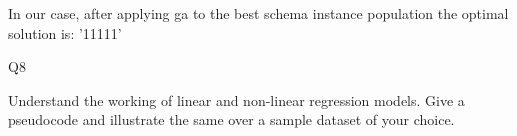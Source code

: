 \documentclass[12pt]{article}
\renewcommand{\_}{\kern-1.5pt\textunderscore\kern-1.5pt}
\begin{document}
In our case, after applying ga to the best schema instance population the optimal solution is: ’11111’\par


\vspace{\baselineskip}

\vspace{\baselineskip}

\vspace{\baselineskip}

\vspace{\baselineskip}

\vspace{\baselineskip}

\vspace{\baselineskip}

\vspace{\baselineskip}

\vspace{\baselineskip}

\vspace{\baselineskip}

\vspace{\baselineskip}

\vspace{\baselineskip}

\vspace{\baselineskip}
\begin{Center}
{\fontsize{28pt}{33.6pt}\selectfont Q8\par}
\end{Center}\par

{\fontsize{14pt}{16.8pt}\selectfont Understand the working of linear and non-linear regression models. Give a pseudocode and illustrate the same over a sample dataset of your choice.\par}\par
\end{document}
